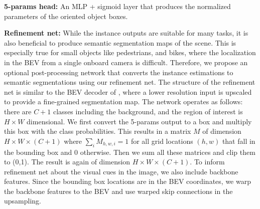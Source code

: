\documentclass[10pt,twocolumn,letterpaper]{article}
\begin{document}
\noindent\textbf{5-params head:} An MLP + sigmoid layer that produces the normalized parameters of the oriented object boxes.

\noindent\textbf{Refinement net:} While the instance outputs are suitable for many tasks, it is also beneficial to produce semantic segmentation maps of the scene. This is especially true for small objects like pedestrians, and bikes, where the localization in the BEV from a single onboard camera is difficult. Therefore, we propose an optional post-processing network that converts the instance estimations to semantic segmentations using our refinement net. The structure of the refinement net is similar to the BEV decoder of \cite{DBLP:journals/corr/abs-2012-03040}, where a lower resolution input is upscaled to provide a fine-grained segmentation map. The network operates as follows: there are $C+1$ classes including the background, and the region of interest is $H \times W$ dimensional. We first convert the 5-params output to a box and multiply this box with the class probabilities. This results in a matrix $M$ of dimension $H \times W \times (C+1)$ where $\sum_i M_{h,w,i} = 1$ for all grid locations $(h,w)$ that fall in the bounding box and 0 otherwise. Then we sum all these matrices and clip them to (0,1). The result is again of dimension $H \times W \times (C+1)$. To inform refinement net about the visual cues in the image, we also include backbone features. Since the bounding box locations are in the BEV coordinates, we warp the backbone features to the BEV and use warped skip connections in the upsampling.
\end{document}

